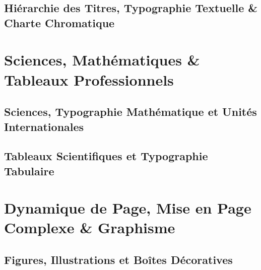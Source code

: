 \documentclass[
  english,             %
  french,              %
  font=calibri,        %
  todoNote             %
]{ClasseGuillaume}
\begin{document}
\chapter{Hiérarchie des Titres, Typographie Textuelle \& Charte Chromatique}
\label{chap:titres_couleurs}




\part{Sciences, Mathématiques \& Tableaux Professionnels}
\label{part:sciences_tables}

\chapter{Sciences, Typographie Mathématique et Unités Internationales}
\label{chap:sciences_maths}



\chapter{Tableaux Scientifiques et Typographie Tabulaire}
\label{chap:tableaux}



\part{Dynamique de Page, Mise en Page Complexe \& Graphisme}
\label{part:graphisme_geometries}

\chapter{Figures, Illustrations et Boîtes Décoratives}
\label{chap:illustrations_boites}


\end{document}
